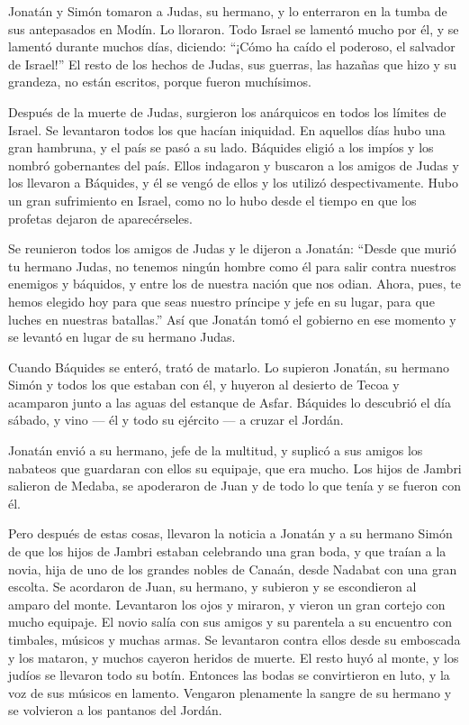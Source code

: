  Jonatán y Simón tomaron a Judas, su hermano, y lo
enterraron en la tumba de sus antepasados en Modín.  Lo
lloraron. Todo Israel se lamentó mucho por él, y se lamentó durante
muchos días, diciendo:  ``¡Cómo ha caído el poderoso, el
salvador de Israel!''  El resto de los hechos de Judas,
sus guerras, las hazañas que hizo y su grandeza, no están escritos,
porque fueron muchísimos.

 Después de la muerte de Judas, surgieron los anárquicos
en todos los límites de Israel. Se levantaron todos los que hacían
iniquidad.  En aquellos días hubo una gran hambruna, y el
país se pasó a su lado.  Báquides eligió a los impíos y
los nombró gobernantes del país.  Ellos indagaron y
buscaron a los amigos de Judas y los llevaron a Báquides, y él se vengó
de ellos y los utilizó despectivamente.  Hubo un gran
sufrimiento en Israel, como no lo hubo desde el tiempo en que los
profetas dejaron de aparecérseles.

 Se reunieron todos los amigos de Judas y le dijeron a
Jonatán:  ``Desde que murió tu hermano Judas, no tenemos
ningún hombre como él para salir contra nuestros enemigos y báquidos, y
entre los de nuestra nación que nos odian.  Ahora, pues,
te hemos elegido hoy para que seas nuestro príncipe y jefe en su lugar,
para que luches en nuestras batallas.''  Así que Jonatán
tomó el gobierno en ese momento y se levantó en lugar de su hermano
Judas.

 Cuando Báquides se enteró, trató de matarlo.
 Lo supieron Jonatán, su hermano Simón y todos los que
estaban con él, y huyeron al desierto de Tecoa y acamparon junto a las
aguas del estanque de Asfar.  Báquides lo descubrió el
día sábado, y vino --- él y todo su ejército --- a cruzar el Jordán.

 Jonatán envió a su hermano, jefe de la multitud, y
suplicó a sus amigos los nabateos que guardaran con ellos su equipaje,
que era mucho.  Los hijos de Jambri salieron de Medaba,
se apoderaron de Juan y de todo lo que tenía y se fueron con él.

 Pero después de estas cosas, llevaron la noticia a
Jonatán y a su hermano Simón de que los hijos de Jambri estaban
celebrando una gran boda, y que traían a la novia, hija de uno de los
grandes nobles de Canaán, desde Nadabat con una gran escolta.
 Se acordaron de Juan, su hermano, y subieron y se
escondieron al amparo del monte.  Levantaron los ojos y
miraron, y vieron un gran cortejo con mucho equipaje. El novio salía con
sus amigos y su parentela a su encuentro con timbales, músicos y muchas
armas.  Se levantaron contra ellos desde su emboscada y
los mataron, y muchos cayeron heridos de muerte. El resto huyó al monte,
y los judíos se llevaron todo su botín.  Entonces las
bodas se convirtieron en luto, y la voz de sus músicos en lamento.
 Vengaron plenamente la sangre de su hermano y se
volvieron a los pantanos del Jordán.

